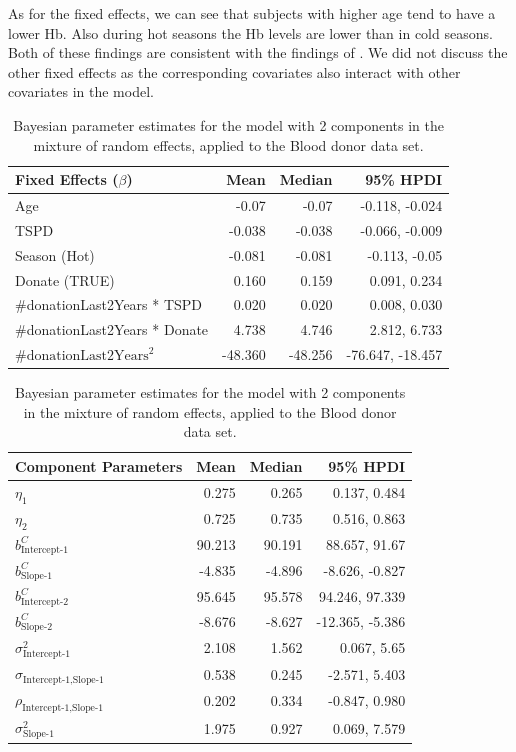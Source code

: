 As for the fixed effects, we can see that subjects with higher age tend to have a lower Hb. Also during hot seasons the Hb levels are lower than in cold seasons. Both of these findings are consistent with the findings of \citet{nasserinejad_predicting_2013,nasserinejad_prevalence_2015,nasserinejad_prediction_2016}. We did not discuss the other fixed effects as the corresponding covariates also interact with other covariates in the model.

\begin{table}[htb]
\centering
\captionsetup{justification=centering}
\caption{Bayesian parameter estimates for the model with 2 components in the mixture of random effects, applied to the Blood donor data set.}
\label{table : bhtge_blooddonor_2comp}
\begin{tabular}{@{}lrrr@{}}
\toprule
Fixed Effects ($\beta$) & Mean & Median & 95\% HPDI \\ \midrule
Age &  -0.07 & -0.07 & -0.118, -0.024\\
TSPD & -0.038 & -0.038 & -0.066, -0.009\\
Season (Hot) & -0.081 & -0.081 & -0.113, -0.05\\
Donate (TRUE) & 0.160 & 0.159 & 0.091, 0.234\\
\#donationLast2Years * TSPD & 0.020 & 0.020 & 0.008, 0.030\\
\#donationLast2Years * Donate & 4.738 & 4.746 & 2.812, 6.733\\
$\text{\#donationLast2Years}^2$  & -48.360 & -48.256 & -76.647, -18.457\\ \bottomrule
\end{tabular}

\begin{tabular}{@{}lrrr@{}}
\toprule
Component Parameters & Mean & Median & 95\% HPDI \\ \midrule
$\eta_1$ & 0.275 & 0.265 & 0.137, 0.484\\
$\eta_2$ & 0.725 & 0.735 & 0.516, 0.863\\

$b_\text{Intercept-1}^C$ & 90.213 & 90.191 & 88.657, 91.67\\
$b_\text{Slope-1}^C$ & -4.835 & -4.896 & -8.626, -0.827\\

$b_\text{Intercept-2}^C$ & 95.645 & 95.578 & 94.246, 97.339\\
$b_\text{Slope-2}^C$ & -8.676 & -8.627 & -12.365, -5.386\\

$\sigma^2_\text{Intercept-1}$ & 2.108 & 1.562 & 0.067, 5.65\\
$\sigma_{\text{Intercept-1}, \text{Slope-1}}$ & 0.538 & 0.245 & -2.571, 5.403\\
$\rho_{\text{Intercept-1}, \text{Slope-1}}$ & 0.202 & 0.334 & -0.847, 0.980\\
$\sigma^2_\text{Slope-1}$ & 1.975 & 0.927 & 0.069, 7.579\\


\end{tabular}
\end{table}
